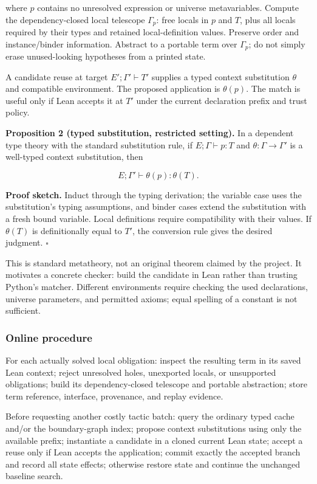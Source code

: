 \documentclass[
  10pt,
]{article}
\newenvironment{Shaded}{}{}
\newcommand{\NormalTok}[1]{#1}
\begin{document}
where \(p\) contains no unresolved expression or universe metavariables.
Compute the dependency-closed local telescope \(\Gamma_p\): free locals
in \(p\) and \(T\), plus all locals required by their types and retained
local-definition values. Preserve order and instance/binder information.
Abstract to a portable term over \(\Gamma_p\); do not simply erase
unused-looking hypotheses from a printed state.

A candidate reuse at target \(E';\Gamma'\vdash T'\) supplies a typed
context substitution \(\theta\) and compatible environment. The proposed
application is \(\theta(p)\). The match is useful only if Lean accepts
it at \(T'\) under the current declaration prefix and trust policy.

\textbf{Proposition 2 (typed substitution, restricted setting).} In a
dependent type theory with the standard substitution rule, if
\(E;\Gamma\vdash p:T\) and \(\theta:\Gamma\to\Gamma'\) is a well-typed
context substitution, then

\[E;\Gamma'\vdash\theta(p):\theta(T).\]

\textbf{Proof sketch.} Induct through the typing derivation; the
variable case uses the substitution's typing assumptions, and binder
cases extend the substitution with a fresh bound variable. Local
definitions require compatibility with their values. If \(\theta(T)\) is
definitionally equal to \(T'\), the conversion rule gives the desired
judgment. \(\square\)

This is standard metatheory, not an original theorem claimed by the
project. It motivates a concrete checker: build the candidate in Lean
rather than trusting Python's matcher. Different environments require
checking the used declarations, universe parameters, and permitted
axioms; equal spelling of a constant is not sufficient.

\subsubsection{Online procedure}\label{online-procedure}

\begin{Shaded}
\begin{Highlighting}[]
\NormalTok{For each actually solved local obligation:}
\NormalTok{  inspect the resulting term in its saved Lean context;}
\NormalTok{  reject unresolved holes, unexported locals, or unsupported obligations;}
\NormalTok{  build its dependency{-}closed telescope and portable abstraction;}
\NormalTok{  store term reference, interface, provenance, and replay evidence.}

\NormalTok{Before requesting another costly tactic batch:}
\NormalTok{  query the ordinary typed cache and/or the boundary{-}graph index;}
\NormalTok{  propose context substitutions using only the available prefix;}
\NormalTok{  instantiate a candidate in a cloned current Lean state;}
\NormalTok{  accept a reuse only if Lean accepts the application;}
\NormalTok{  commit exactly the accepted branch and record all state effects;}
\NormalTok{  otherwise restore state and continue the unchanged baseline search.}
\end{Highlighting}
\end{Shaded}
\end{document}
